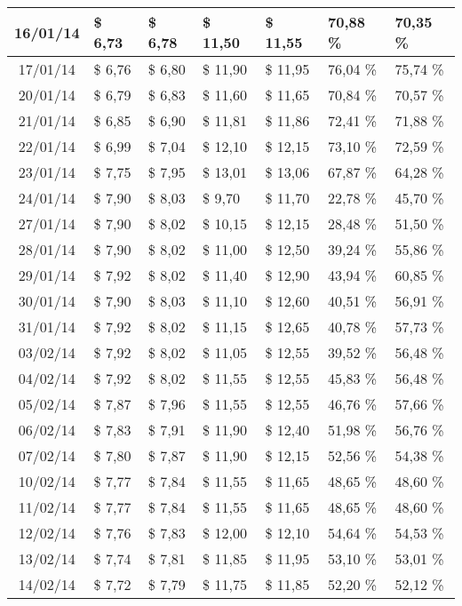 \begin{center}
\begin{longtable}{|c|p{1.5cm}|p{1.5cm}|p{1.5cm}|p{1.5cm}|p{1.5cm}|p{1.5cm}|}
16/01/14 & \$ 6,73 & \$ 6,78 & \$ 11,50 & \$ 11,55 & 70,88 \% & 70,35 \% \\ \hline
17/01/14 & \$ 6,76 & \$ 6,80 & \$ 11,90 & \$ 11,95 & 76,04 \% & 75,74 \% \\ \hline
20/01/14 & \$ 6,79 & \$ 6,83 & \$ 11,60 & \$ 11,65 & 70,84 \% & 70,57 \% \\ \hline
21/01/14 & \$ 6,85 & \$ 6,90 & \$ 11,81 & \$ 11,86 & 72,41 \% & 71,88 \% \\ \hline
22/01/14 & \$ 6,99 & \$ 7,04 & \$ 12,10 & \$ 12,15 & 73,10 \% & 72,59 \% \\ \hline
23/01/14 & \$ 7,75 & \$ 7,95 & \$ 13,01 & \$ 13,06 & 67,87 \% & 64,28 \% \\ \hline
24/01/14 & \$ 7,90 & \$ 8,03 & \$ 9,70 & \$ 11,70 & 22,78 \% & 45,70 \% \\ \hline
27/01/14 & \$ 7,90 & \$ 8,02 & \$ 10,15 & \$ 12,15 & 28,48 \% & 51,50 \% \\ \hline
28/01/14 & \$ 7,90 & \$ 8,02 & \$ 11,00 & \$ 12,50 & 39,24 \% & 55,86 \% \\ \hline
29/01/14 & \$ 7,92 & \$ 8,02 & \$ 11,40 & \$ 12,90 & 43,94 \% & 60,85 \% \\ \hline
30/01/14 & \$ 7,90 & \$ 8,03 & \$ 11,10 & \$ 12,60 & 40,51 \% & 56,91 \% \\ \hline
31/01/14 & \$ 7,92 & \$ 8,02 & \$ 11,15 & \$ 12,65 & 40,78 \% & 57,73 \% \\ \hline
03/02/14 & \$ 7,92 & \$ 8,02 & \$ 11,05 & \$ 12,55 & 39,52 \% & 56,48 \% \\ \hline
04/02/14 & \$ 7,92 & \$ 8,02 & \$ 11,55 & \$ 12,55 & 45,83 \% & 56,48 \% \\ \hline
05/02/14 & \$ 7,87 & \$ 7,96 & \$ 11,55 & \$ 12,55 & 46,76 \% & 57,66 \% \\ \hline
06/02/14 & \$ 7,83 & \$ 7,91 & \$ 11,90 & \$ 12,40 & 51,98 \% & 56,76 \% \\ \hline
07/02/14 & \$ 7,80 & \$ 7,87 & \$ 11,90 & \$ 12,15 & 52,56 \% & 54,38 \% \\ \hline
10/02/14 & \$ 7,77 & \$ 7,84 & \$ 11,55 & \$ 11,65 & 48,65 \% & 48,60 \% \\ \hline
11/02/14 & \$ 7,77 & \$ 7,84 & \$ 11,55 & \$ 11,65 & 48,65 \% & 48,60 \% \\ \hline
12/02/14 & \$ 7,76 & \$ 7,83 & \$ 12,00 & \$ 12,10 & 54,64 \% & 54,53 \% \\ \hline
13/02/14 & \$ 7,74 & \$ 7,81 & \$ 11,85 & \$ 11,95 & 53,10 \% & 53,01 \% \\ \hline
14/02/14 & \$ 7,72 & \$ 7,79 & \$ 11,75 & \$ 11,85 & 52,20 \% & 52,12 \% \\ \hline

\end{longtable}
\end{center}
